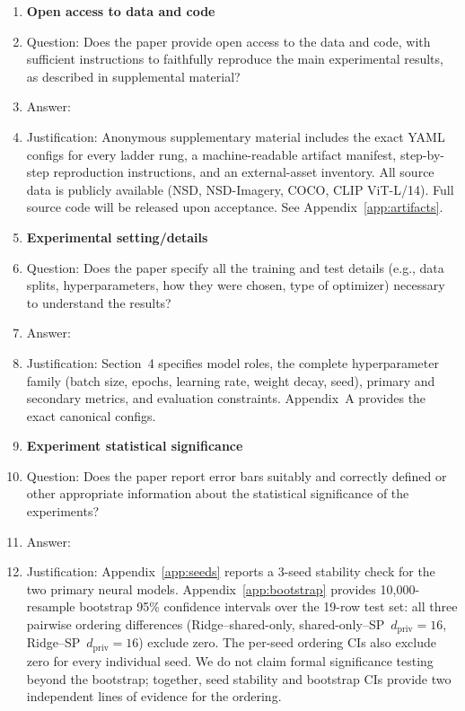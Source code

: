 \begin{enumerate}
\item {\bf Open access to data and code}
    \item[] Question: Does the paper provide open access to the data and code, with sufficient instructions to faithfully reproduce the main experimental results, as described in supplemental material?
    \item[] Answer: \answerYes{}
    \item[] Justification: Anonymous supplementary material includes the exact YAML configs for every ladder rung, a machine-readable artifact manifest, step-by-step reproduction instructions, and an external-asset inventory.  All source data is publicly available (NSD, NSD-Imagery, COCO, CLIP ViT-L/14).  Full source code will be released upon acceptance.  See Appendix~\ref{app:artifacts}.

\item {\bf Experimental setting/details}
    \item[] Question: Does the paper specify all the training and test details (e.g., data splits, hyperparameters, how they were chosen, type of optimizer) necessary to understand the results?
    \item[] Answer: \answerYes{}
    \item[] Justification: Section~4 specifies model roles, the complete hyperparameter family (batch size, epochs, learning rate, weight decay, seed), primary and secondary metrics, and evaluation constraints.  Appendix~A provides the exact canonical configs.

\item {\bf Experiment statistical significance}
    \item[] Question: Does the paper report error bars suitably and correctly defined or other appropriate information about the statistical significance of the experiments?
    \item[] Answer: \answerYes{}
    \item[] Justification: Appendix~\ref{app:seeds} reports a 3-seed stability check for the two primary neural models.  Appendix~\ref{app:bootstrap} provides 10{,}000-resample bootstrap 95\% confidence intervals over the 19-row test set: all three pairwise ordering differences (Ridge--shared-only, shared-only--SP~$d_\mathrm{priv}\!=\!16$, Ridge--SP~$d_\mathrm{priv}\!=\!16$) exclude zero.  The per-seed ordering CIs also exclude zero for every individual seed.  We do not claim formal significance testing beyond the bootstrap; together, seed stability and bootstrap CIs provide two independent lines of evidence for the ordering.


\end{enumerate}
